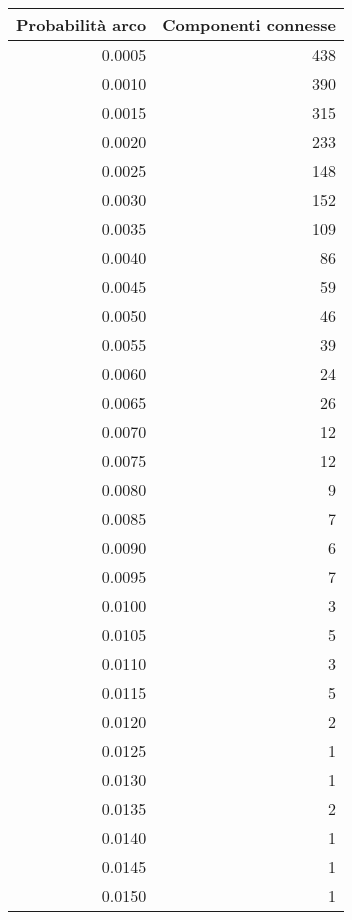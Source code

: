 \begin{tabular}{rr}
\toprule
 Probabilità arco &  Componenti connesse \\
\midrule
           0.0005 &                  438 \\
           0.0010 &                  390 \\
           0.0015 &                  315 \\
           0.0020 &                  233 \\
           0.0025 &                  148 \\
           0.0030 &                  152 \\
           0.0035 &                  109 \\
           0.0040 &                   86 \\
           0.0045 &                   59 \\
           0.0050 &                   46 \\
           0.0055 &                   39 \\
           0.0060 &                   24 \\
           0.0065 &                   26 \\
           0.0070 &                   12 \\
           0.0075 &                   12 \\
           0.0080 &                    9 \\
           0.0085 &                    7 \\
           0.0090 &                    6 \\
           0.0095 &                    7 \\
           0.0100 &                    3 \\
           0.0105 &                    5 \\
           0.0110 &                    3 \\
           0.0115 &                    5 \\
           0.0120 &                    2 \\
           0.0125 &                    1 \\
           0.0130 &                    1 \\
           0.0135 &                    2 \\
           0.0140 &                    1 \\
           0.0145 &                    1 \\
           0.0150 &                    1 \\

\end{tabular}

